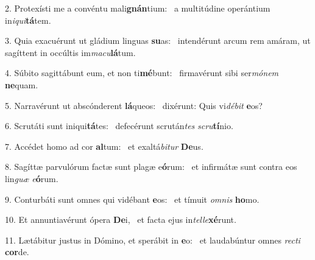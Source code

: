 2. Protexísti me a convéntu mali\textbf{gnán}tium: \ast\  a multitúdine operántium in\textit{i}\textit{qui}\textbf{tá}tem.\

3. Quia exacuérunt ut gládium linguas \textbf{su}as: \ast\  intendérunt arcum rem amáram, ut sagíttent in occúltis im\textit{ma}\textit{cu}\textbf{lá}tum.\

4. Súbito sagittábunt eum, et non ti\textbf{mé}bunt: \ast\  firmavérunt sibi ser\textit{mó}\textit{nem} \textbf{ne}quam.\

5. Narravérunt ut abscónderent \textbf{lá}queos: \ast\  dixérunt: Quis vi\textit{dé}\textit{bit} \textbf{e}os?\

6. Scrutáti sunt iniqui\textbf{tá}tes: \ast\  defecérunt scrután\textit{tes} \textit{scru}\textbf{tí}nio.\

7. Accédet homo ad cor \textbf{al}tum: \ast\  et exaltá\textit{bi}\textit{tur} \textbf{De}us.\

8. Sagíttæ parvulórum factæ sunt plagæ e\textbf{ó}rum: \ast\  et infirmátæ sunt contra eos lin\textit{guæ} \textit{e}\textbf{ó}rum.\

9. Conturbáti sunt omnes qui vidébant \textbf{e}os: \ast\  et tímuit \textit{om}\textit{nis} \textbf{ho}mo.\

10. Et annuntiavérunt ópera \textbf{De}i, \ast\  et facta ejus in\textit{tel}\textit{le}\textbf{xé}runt.\

11. Lætábitur justus in Dómino, et sperábit in \textbf{e}o: \ast\  et laudabúntur omnes \textit{rec}\textit{ti} \textbf{cor}de.\

